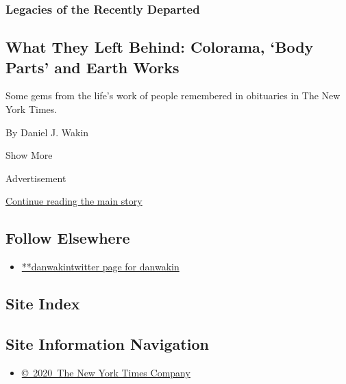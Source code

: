 \begin{enumerate}
{  \subsubsection{Legacies of the Recently
  Departed}\label{legacies-of-the-recently-departed-1}}

  \hypertarget{what-they-left-behind-colorama-body-parts-and-earth-works}{%
  \subsection{What They Left Behind: Colorama, `Body Parts' and Earth
  Works}\label{what-they-left-behind-colorama-body-parts-and-earth-works}}

  Some gems from the life's work of people remembered in obituaries in
  The New York Times.

  By Daniel J. Wakin
\end{enumerate}

Show More

Advertisement

\protect\hyperlink{after-mid2}{Continue reading the main story}

\hypertarget{follow-elsewhere}{%
\subsection{Follow Elsewhere}\label{follow-elsewhere}}

\begin{itemize}
\tightlist
\item
  \href{https://twitter.com/danwakin}{**danwakintwitter page for
  danwakin}
\end{itemize}

\hypertarget{site-index}{%
\subsection{Site Index}\label{site-index}}

\hypertarget{site-information-navigation}{%
\subsection{Site Information
Navigation}\label{site-information-navigation}}

\begin{itemize}
\tightlist
\item
  \href{https://help.nytimes.com/hc/en-us/articles/115014792127-Copyright-notice}{©~2020~The
  New York Times Company}
\end{itemize}

